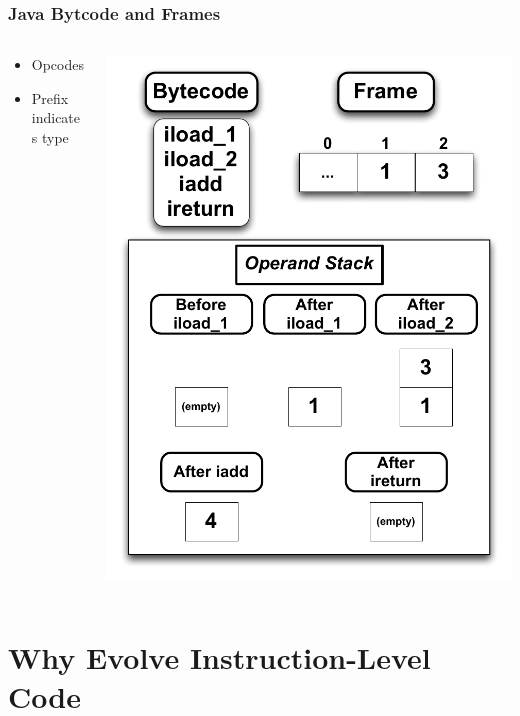 \documentclass{beamer}
\begin{document}
\begin{frame}
\frametitle{Java Bytcode and Frames}
\begin{columns}
\begin{column}{0.5\textwidth}
\begin{itemize}	
\item Opcodes
\item Prefix indicates type
\end{itemize}
\end{column}

\begin{column}{0.5\textwidth}
\includegraphics[height=.8\textheight]{Illustrations/stackBytecode.pdf}
\end{column}
\end{columns}
\end{frame}




\section[Why Instruction-level code]{Why Evolve Instruction-Level Code}
\end{document}
